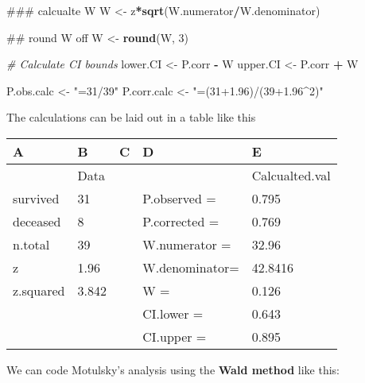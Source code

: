 \documentclass[]{book}
\newenvironment{Shaded}{\begin{snugshade}}{\end{snugshade}}
\newcommand{\KeywordTok}[1]{\textcolor[rgb]{0.13,0.29,0.53}{\textbf{#1}}}
\newcommand{\DecValTok}[1]{\textcolor[rgb]{0.00,0.00,0.81}{#1}}
\newcommand{\StringTok}[1]{\textcolor[rgb]{0.31,0.60,0.02}{#1}}
\newcommand{\CommentTok}[1]{\textcolor[rgb]{0.56,0.35,0.01}{\textit{#1}}}
\newcommand{\OperatorTok}[1]{\textcolor[rgb]{0.81,0.36,0.00}{\textbf{#1}}}
\newcommand{\NormalTok}[1]{#1}
\theoremstyle{definition}
\theoremstyle{definition}
\theoremstyle{definition}
\theoremstyle{remark}
\begin{document}
\begin{Shaded}
\begin{Highlighting}[]
\NormalTok{### calcualte W}
\NormalTok{W             <-}\StringTok{ }\NormalTok{z}\OperatorTok{*}\KeywordTok{sqrt}\NormalTok{(W.numerator}\OperatorTok{/}\NormalTok{W.denominator)}
  
\NormalTok{## round W off }
\NormalTok{W <-}\StringTok{ }\KeywordTok{round}\NormalTok{(W, }\DecValTok{3}\NormalTok{)}

\CommentTok{# Calculate CI bounds}
\NormalTok{lower.CI <-}\StringTok{ }\NormalTok{P.corr }\OperatorTok{-}\StringTok{ }\NormalTok{W}
\NormalTok{upper.CI <-}\StringTok{ }\NormalTok{P.corr }\OperatorTok{+}\StringTok{ }\NormalTok{W}

\NormalTok{P.obs.calc  <-}\StringTok{ "=31/39"}
\NormalTok{P.corr.calc <-}\StringTok{ "=(31+1.96)/(39+1.96^2)"}
\end{Highlighting}
\end{Shaded}

The calculations can be laid out in a table like this

\begin{tabular}{l|l|l|l|l}
\hline
A & B & C & D & E\\
\hline
 & Data &  &  & Calcualted.val\\
\hline
survived & 31 &  & P.observed   = & 0.795\\
\hline
deceased & 8 &  & P.corrected  = & 0.769\\
\hline
n.total & 39 &  & W.numerator  = & 32.96\\
\hline
z & 1.96 &  & W.denominator= & 42.8416\\
\hline
z.squared & 3.842 &  & W = & 0.126\\
\hline
 &  &  & CI.lower = & 0.643\\
\hline
 &  &  & CI.upper = & 0.895\\
\hline
\end{tabular}

We can code Motulsky's analysis using the \textbf{Wald method} like
this:
\end{document}
